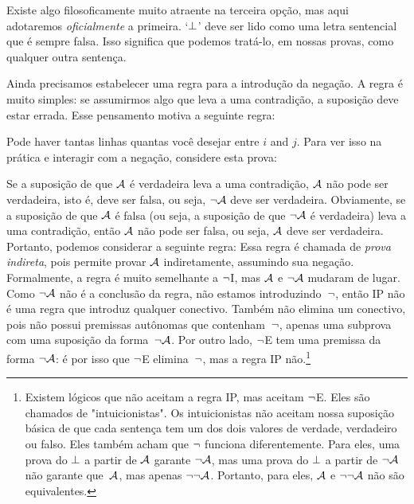 Existe algo filosoficamente  muito atraente na terceira op\c c\~ao, mas aqui adotaremos \emph{oficialmente} a primeira. `$\bot$'  deve ser lido como uma letra sentencial que \'e sempre falsa. Isso significa que podemos tratá-lo, em nossas provas, como qualquer outra senten\c ca.

Ainda precisamos estabelecer uma regra para a introdu\c c\~ao da nega\c c\~ao. A regra \'e muito simples: se assumirmos algo que leva a uma contradi\c c\~ao, a suposi\c c\~ao deve estar errada. Esse pensamento motiva a seguinte regra:

Pode haver tantas linhas quantas voc\^e desejar entre $i$ and $j$. Para ver isso na pr\'atica e interagir com a nega\c c\~ao, considere esta prova: 
	\begin{fitchproof}
		\open
		\close
	\end{fitchproof}

Se a suposi\c c\~ao de que $\mathcal{A}$ \'e verdadeira leva a uma contradi\c c\~ao, $\mathcal{A}$ n\~ao pode ser verdadeira, isto \'e, deve ser falsa, ou seja, $\neg\mathcal{A}$ deve ser verdadeira. Obviamente, se a suposi\c c\~ao de que $\mathcal{A}$ \'e falsa (ou seja, a suposi\c c\~ao de que $\neg\mathcal{A}$ \'e verdadeira)  leva a uma contradi\c c\~ao, ent\~ao $\mathcal{A}$ n\~ao pode ser falsa, ou seja, $\mathcal{A}$ deve ser verdadeira. Portanto, podemos considerar a seguinte regra:
Essa regra \'e chamada de \emph{prova indireta}, pois permite provar $\mathcal{A}$  indiretamente, assumindo sua nega\c c\~ao. Formalmente, a regra \'e muito semelhante a $\neg$I, mas $\mathcal{A}$ e $\neg\mathcal{A}$ mudaram de lugar. Como $\neg\mathcal{A}$ n\~ao \'e a conclus\~ao da regra, n\~ao estamos introduzindo~$\neg$, ent\~ao  IP n\~ao \'e uma regra que introduz qualquer conectivo. Tamb\'em n\~ao elimina um conectivo, pois n\~ao possui premissas aut\^onomas que contenham~$\neg$, apenas uma subprova com uma suposi\c c\~ao da forma~$\neg\mathcal{A}$. Por outro lado, $\neg$E tem uma premissa da forma $\neg\mathcal{A}$: \'e por isso que $\neg$E elimina~$\neg$, mas a regra IP n\~ao.\footnote{Existem l\'ogicos que n\~ao aceitam a regra IP, mas aceitam $\neg$E. Eles s\~ao chamados de "intuicionistas". Os intuicionistas n\~ao aceitam nossa suposi\c c\~ao b\'asica de que cada senten\c ca tem um dos dois valores de verdade, verdadeiro ou falso. Eles tamb\'em acham que $\neg$ funciona diferentemente. Para eles, uma prova do $\bot$ a partir de $\mathcal{A}$ garante $\neg \mathcal{A}$, mas uma prova do $\bot$ a partir de $\neg\mathcal{A}$ n\~ao garante que~$\mathcal{A}$, mas apenas $\neg\neg\mathcal{A}$. Portanto, para eles, $\mathcal{A}$ e $\neg\neg\mathcal{A}$ n\~ao s\~ao equivalentes.}


